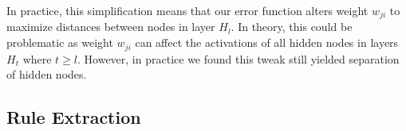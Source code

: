 In practice, this simplification means that our error function alters weight
$w_{ji}$ to maximize distances between nodes in layer $H_{l}$. In theory, this
could be problematic as weight $w_{ji}$ can affect the activations of all
hidden nodes in layers $H_{t}$ where $t \geq l$. However, in practice we
found this tweak still yielded separation of hidden nodes.

\subsection{Rule Extraction}
\label{sec:re}

